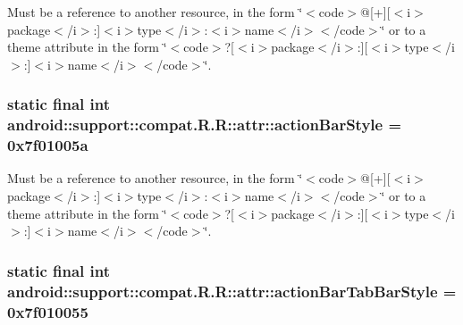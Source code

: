 Must be a reference to another resource, in the form \char`\"{}$<$code$>$@\mbox{[}+\mbox{]}\mbox{[}$<$i$>$package$<$/i$>$:\mbox{]}$<$i$>$type$<$/i$>$:$<$i$>$name$<$/i$>$$<$/code$>$\char`\"{} or to a theme attribute in the form \char`\"{}$<$code$>$?\mbox{[}$<$i$>$package$<$/i$>$:\mbox{]}\mbox{[}$<$i$>$type$<$/i$>$:\mbox{]}$<$i$>$name$<$/i$>$$<$/code$>$\char`\"{}. \hypertarget{classandroid_1_1support_1_1compat_1_1_r_1_1attr_0cd78d86e53877b420c936e1eecf1cbe}{
\subsubsection[{actionBarStyle}]{\setlength{\rightskip}{0pt plus 5cm}static final int android::support::compat.R.R::attr::actionBarStyle = 0x7f01005a}}
\label{classandroid_1_1support_1_1compat_1_1_r_1_1attr_0cd78d86e53877b420c936e1eecf1cbe}


Must be a reference to another resource, in the form \char`\"{}$<$code$>$@\mbox{[}+\mbox{]}\mbox{[}$<$i$>$package$<$/i$>$:\mbox{]}$<$i$>$type$<$/i$>$:$<$i$>$name$<$/i$>$$<$/code$>$\char`\"{} or to a theme attribute in the form \char`\"{}$<$code$>$?\mbox{[}$<$i$>$package$<$/i$>$:\mbox{]}\mbox{[}$<$i$>$type$<$/i$>$:\mbox{]}$<$i$>$name$<$/i$>$$<$/code$>$\char`\"{}. \hypertarget{classandroid_1_1support_1_1compat_1_1_r_1_1attr_6248cf0bc0dc20603b45734452f2659f}{
\subsubsection[{actionBarTabBarStyle}]{\setlength{\rightskip}{0pt plus 5cm}static final int android::support::compat.R.R::attr::actionBarTabBarStyle = 0x7f010055}}
\label{classandroid_1_1support_1_1compat_1_1_r_1_1attr_6248cf0bc0dc20603b45734452f2659f}


